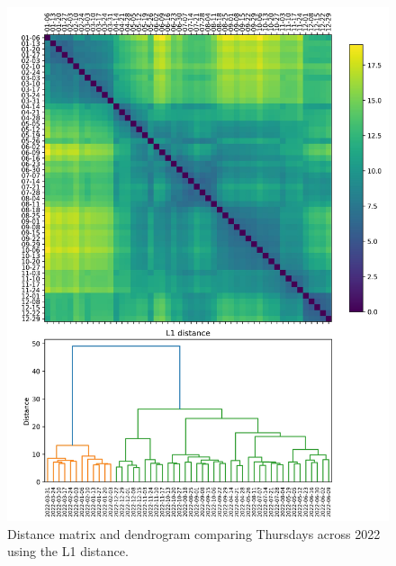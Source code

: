 \documentclass[../main.tex]{subfiles}
\begin{document}
\begin{figure}[ht]
\centering
\vspace{-30mm}
\begin{adjustbox}{center}
\includegraphics[width=1.3\textwidth]{graphics/results/L1_Thu.png}
\end{adjustbox}
\caption{Distance matrix and dendrogram comparing Thursdays across 2022 using the L1 distance.}
\label{fig:thu-L1}
\end{figure}
\end{document}
